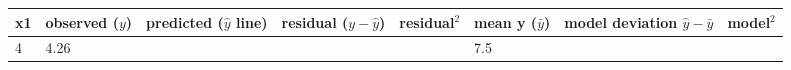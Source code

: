 \documentclass[]{article}
\begin{document}
\begin{longtable}[]{@{}llllllll@{}}
\toprule
\begin{minipage}[b]{0.02\columnwidth}\raggedright
x1\strut
\end{minipage} & \begin{minipage}[b]{0.04\columnwidth}\raggedright
observed (\(y\))\strut
\end{minipage} & \begin{minipage}[b]{0.10\columnwidth}\raggedright
predicted (\(\hat{y}\) line)\strut
\end{minipage} & \begin{minipage}[b]{0.12\columnwidth}\raggedright
residual (\(y-\hat{y}\))\strut
\end{minipage} & \begin{minipage}[b]{0.12\columnwidth}\raggedright
residual\(^2\)\strut
\end{minipage} & \begin{minipage}[b]{0.12\columnwidth}\raggedright
mean y (\(\bar{y}\))\strut
\end{minipage} & \begin{minipage}[b]{0.12\columnwidth}\raggedright
model deviation \(\hat{y}-\bar{y}\)\strut
\end{minipage} & \begin{minipage}[b]{0.12\columnwidth}\raggedright
model\(^2\)\strut
\end{minipage}\tabularnewline
\midrule
\endhead
\begin{minipage}[t]{0.02\columnwidth}\raggedright
4\strut
\end{minipage} & \begin{minipage}[t]{0.04\columnwidth}\raggedright
4.26\strut
\end{minipage} & \begin{minipage}[t]{0.10\columnwidth}\raggedright
\strut
\end{minipage} & \begin{minipage}[t]{0.12\columnwidth}\raggedright
\strut
\end{minipage} & \begin{minipage}[t]{0.12\columnwidth}\raggedright
\strut
\end{minipage} & \begin{minipage}[t]{0.12\columnwidth}\raggedright
7.5\strut
\end{minipage} & \begin{minipage}[t]{0.12\columnwidth}\raggedright
\strut
\end{minipage} & \begin{minipage}[t]{0.12\columnwidth}\raggedright

\end{minipage}
\end{longtable}
\end{document}

